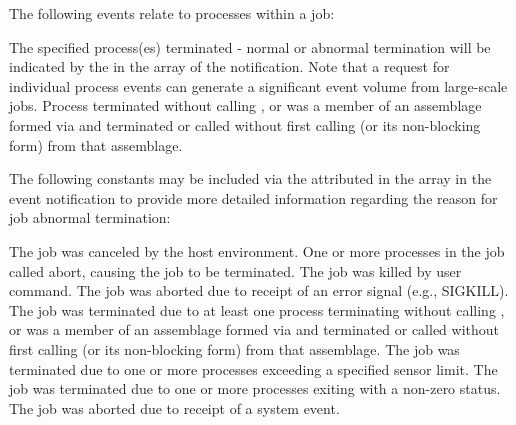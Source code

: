 The following events relate to processes within a job:

\begin{constantdesc}
%
The specified process(es) terminated - normal or abnormal
termination will be indicated by the  in the
 array of the notification. Note that a request for individual
process events can generate a significant event volume from large-scale jobs.
%
Process terminated without calling , or was a member of an assemblage formed via  and terminated or called  without first calling  (or its non-blocking form) from that assemblage.
%
\end{constantdesc}

The following constants may be included via the
 attributed in the  array in the
 event notification to provide more detailed
information regarding the reason for job abnormal termination:

\begin{constantdesc}
%
The job was canceled by the host environment.
%
One or more processes in the job called abort, causing the job to be terminated.
%
The job was killed by user command.
%
The job was aborted due to receipt of an error signal (e.g., SIGKILL).
%
The job was terminated due to at least one process terminating without calling , or was a member of an assemblage formed via  and terminated or called  without first calling  (or its non-blocking form) from that assemblage.
%
The job was terminated due to one or more processes exceeding a specified sensor limit.
%
The job was terminated due to one or more processes exiting with a non-zero status.
%
The job was aborted due to receipt of a system event.
%
\end{constantdesc}


